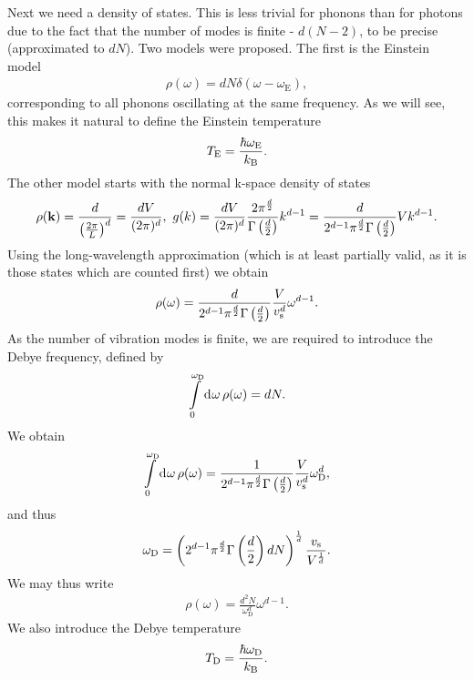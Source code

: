 Next we need a density of states. This is less trivial for phonons than for photons due to the fact that the number of modes is finite - $d(N - 2)$, to be precise (approximated to $dN$). Two models were proposed. The first is the Einstein model
\begin{align*}
	\rho(\omega) = dN\delta(\omega - \omega_{\text{E}}),
\end{align*}
corresponding to all phonons oscillating at the same frequency. As we will see, this makes it natural to define the Einstein temperature
\begin{align*}
	T_{\text{E}} = \frac{\hbar\omega_{\text{E}}}{k_{\text{B}}}.
\end{align*}
The other model starts with the normal k-space density of states
\begin{align*}
	\rho(\vb{k}) = \frac{d}{\left(\frac{2\pi}{L}\right)^{d}} = \frac{dV}{(2\pi)^{d}},\ g(k) = \frac{dV}{(2\pi)^{d}}\frac{2\pi^{\frac{d}{2}}}{\Gamma\left(\frac{d}{2}\right)}k^{d - 1} = \frac{d}{2^{d - 1}\pi^{\frac{d}{2}}\Gamma\left(\frac{d}{2}\right)}Vk^{d - 1}.
\end{align*}
Using the long-wavelength approximation (which is at least partially valid, as it is those states which are counted first) we obtain
\begin{align*}
	\rho(\omega) = \frac{d}{2^{d - 1}\pi^{\frac{d}{2}}\Gamma\left(\frac{d}{2}\right)}\frac{V}{v_{\text{s}}^{d}}\omega^{d - 1}.
\end{align*}
As the number of vibration modes is finite, we are required to introduce the Debye frequency, defined by
\begin{align*}
	\int\limits_{0}^{\omega_{\text{D}}}\dd[]{\omega}\rho(\omega) = dN.
\end{align*}
We obtain
\begin{align*}
	\int\limits_{0}^{\omega_{\text{D}}}\dd[]{\omega}\rho(\omega) = \frac{1}{2^{d - 1}\pi^{\frac{d}{2}}\Gamma\left(\frac{d}{2}\right)}\frac{V}{v_{\text{s}}^{d}}\omega_{\text{D}}^{d},
\end{align*}
and thus
\begin{align*}
	\omega_{\text{D}} = \left(2^{d - 1}\pi^{\frac{d}{2}}\Gamma\left(\frac{d}{2}\right)dN\right)^{\frac{1}{d}}\frac{v_{\text{s}}}{V^{\frac{1}{d}}}.
\end{align*}
We may thus write
\begin{align*}
	\rho(\omega) = \frac{d^{2}N}{\omega_{\text{D}}^{d}}\omega^{d - 1}.
\end{align*}
We also introduce the Debye temperature
\begin{align*}
	T_{\text{D}} = \frac{\hbar\omega_{\text{D}}}{k_{\text{B}}}.
\end{align*}

